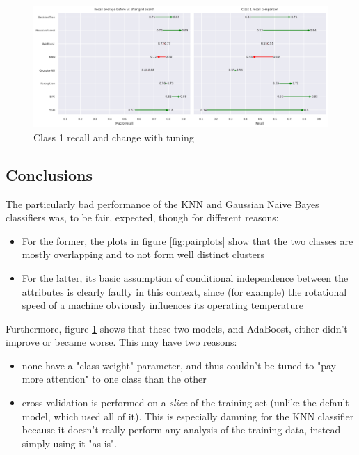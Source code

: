 \begin{frame}{\subsecname}
\begin{figure}
    \centering
    \includegraphics[width=1\linewidth]{images/recall_change.png}
    \caption{Class 1 recall and  change with tuning}
    \label{fig:recall_change}
\end{figure}
\end{frame}

\subsection{Conclusions}
\begin{frame}{\subsecname}
The particularly bad performance of the KNN and Gaussian Naive Bayes classifiers was, to be fair, expected, though for different reasons:
\begin{itemize}
    \small
    \justifying
    \item For the former, the plots in figure \ref{fig:pairplots} show that the two classes are mostly overlapping and to not form well distinct clusters
    \item For the latter, its basic assumption of conditional independence between the attributes is clearly faulty in this context, since (for example) the rotational speed of a machine obviously influences its operating temperature
\end{itemize}

Furthermore, figure \ref{fig:recall_change} shows that these two models, and AdaBoost, either didn't improve or became worse. This may have two reasons:
\begin{itemize}
    \small
    \justifying
    \item none have a "class weight" parameter, and thus couldn't be tuned to "pay more attention" to one class than the other
    \item cross-validation is performed on a \textit{slice} of the training set (unlike the default model, which used all of it). This is especially damning for the KNN classifier because it doesn't really perform any analysis of the training data, instead simply using it "as-is".
\end{itemize}

\end{frame}

